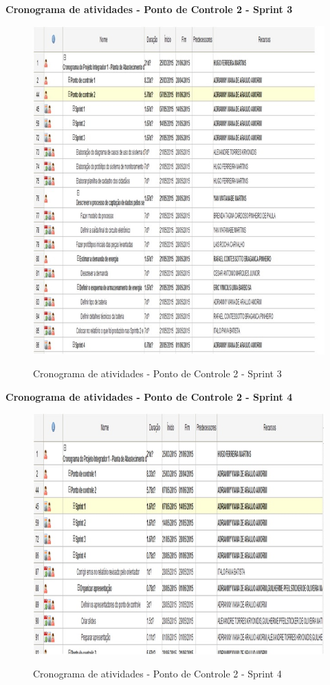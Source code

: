    \pagebreak
   \textbf{Cronograma de atividades - Ponto de Controle 2 - Sprint 3}
   \begin{figure}[!h]
    \centering
    \includegraphics[scale = 0.8]{editaveis/figuras/cronogramaPC2S3}
    \label{Cronograma de atividades PC2S3}
    \caption{Cronograma de atividades - Ponto de Controle 2 - Sprint 3}
   \end{figure}
   \FloatBarrier
   
    \pagebreak
   \textbf{Cronograma de atividades - Ponto de Controle 2 - Sprint 4}
   \begin{figure}[!h]
    \centering
    \includegraphics[scale = 0.8]{editaveis/figuras/cronogramaPC2S4}
    \label{Cronograma de atividades PC2S4}
    \caption{Cronograma de atividades - Ponto de Controle 2 - Sprint 4}
   \end{figure}
   \FloatBarrier
   
